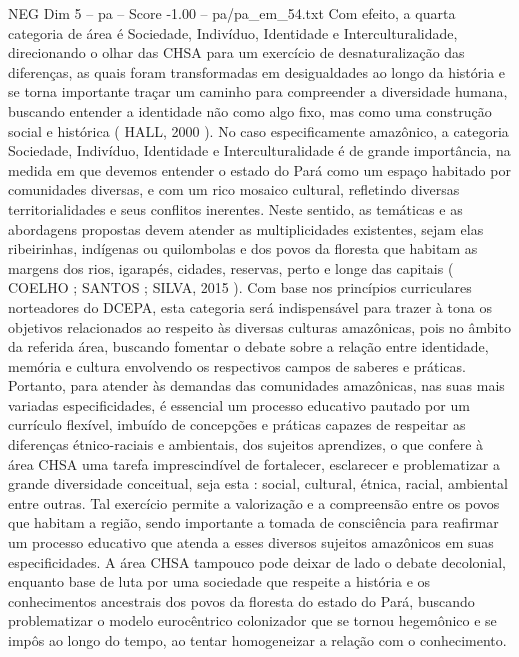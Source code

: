 \begin{textsample}{NEG Dim 5 – pa – Score -1.00 – pa/pa\_em\_54.txt}  \label{ex:f5_neg_048}
Com efeito, a quarta categoria de área é Sociedade, Indivíduo, Identidade e Interculturalidade, direcionando o olhar das CHSA para um exercício de desnaturalização das diferenças, as quais foram transformadas em desigualdades ao longo da história e se torna importante traçar um caminho para compreender a diversidade humana, buscando entender a identidade não como algo fixo, mas como uma construção social e histórica ( HALL, 2000 ).
No caso especificamente amazônico, a categoria Sociedade, Indivíduo, Identidade e Interculturalidade é de grande importância, na medida em que devemos entender o estado do Pará como um espaço habitado por comunidades diversas, e com um rico mosaico cultural, refletindo diversas territorialidades e seus conflitos inerentes.
Neste sentido, as temáticas e as abordagens propostas devem atender as multiplicidades existentes, sejam elas ribeirinhas, indígenas ou quilombolas e dos povos da floresta que habitam as margens dos rios, igarapés, cidades, reservas, perto e longe das capitais ( COELHO ; SANTOS ; SILVA, 2015 ).
Com base nos princípios curriculares norteadores do DCEPA, esta categoria será indispensável para trazer à tona os objetivos relacionados ao respeito às diversas culturas amazônicas, pois no âmbito da referida área, buscando fomentar o debate sobre a relação entre identidade, memória e cultura envolvendo os respectivos campos de saberes e práticas.
Portanto, para atender às demandas das comunidades amazônicas, nas suas mais variadas especificidades, é essencial um processo educativo pautado por um currículo flexível, imbuído de concepções e práticas capazes de respeitar as diferenças étnico-raciais e ambientais, dos sujeitos aprendizes, o que confere à área CHSA uma tarefa imprescindível de fortalecer, esclarecer e problematizar a grande diversidade conceitual, seja esta : social, cultural, étnica, racial, ambiental entre outras.
Tal exercício permite a valorização e a compreensão entre os povos que habitam a região, sendo importante a tomada de consciência para reafirmar um processo educativo que atenda a esses diversos sujeitos amazônicos em suas especificidades.
A área CHSA tampouco pode deixar de lado o debate decolonial, enquanto base de luta por uma sociedade que respeite a história e os conhecimentos ancestrais dos povos da floresta do estado do Pará, buscando problematizar o modelo eurocêntrico colonizador que se tornou hegemônico e se impôs ao longo do tempo, ao tentar homogeneizar a relação com o conhecimento.

\end{textsample}

